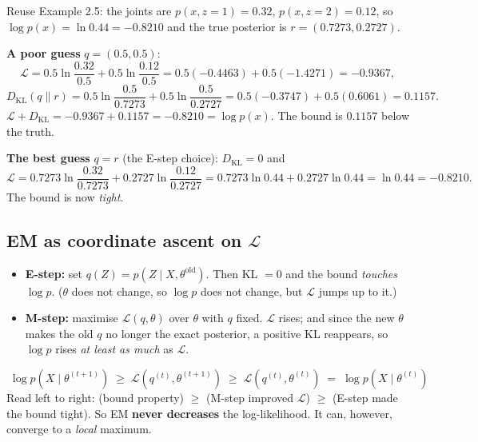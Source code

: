 \documentclass[11pt,a4paper]{article}
\newcommand{\KL}{D_{\mathrm{KL}}}
\newcommand{\Lb}{\mathcal{L}}
\begin{document}
\begin{example}[Example 3.3: Checking $\log p=\Lb+\mathrm{KL}$ numerically]
Reuse Example 2.5: the joints are $p(x,z{=}1)=0.32$, $p(x,z{=}2)=0.12$, so $\log p(x)=\ln0.44=-0.8210$ and the true posterior is $r=(0.7273,0.2727)$.

\textbf{A poor guess} $q=(0.5,0.5)$:
\[
\Lb=0.5\ln\frac{0.32}{0.5}+0.5\ln\frac{0.12}{0.5}=0.5(-0.4463)+0.5(-1.4271)=-0.9367,
\]
\[
\KL(q\|r)=0.5\ln\frac{0.5}{0.7273}+0.5\ln\frac{0.5}{0.2727}=0.5(-0.3747)+0.5(0.6061)=0.1157.
\]
$\Lb+\KL=-0.9367+0.1157=-0.8210=\log p(x)$. \checkmark\quad The bound is $0.1157$ below the truth.

\textbf{The best guess} $q=r$ (the E-step choice): $\KL=0$ and
\[
\Lb=0.7273\ln\frac{0.32}{0.7273}+0.2727\ln\frac{0.12}{0.2727}=0.7273\ln0.44+0.2727\ln0.44=\ln0.44=-0.8210.
\]
The bound is now \emph{tight}.
\end{example}

\subsection{EM as coordinate ascent on \texorpdfstring{$\Lb$}{L}}

\begin{center}
\end{center}

\begin{itemize}[leftmargin=*]
\item \textbf{E-step:} set $q(Z)=p(Z\mid X,\theta^{\text{old}})$. Then KL $=0$ and the bound \emph{touches} $\log p$. ($\theta$ does not change, so $\log p$ does not change, but $\Lb$ jumps up to it.)
\item \textbf{M-step:} maximise $\Lb(q,\theta)$ over $\theta$ with $q$ fixed. $\Lb$ rises; and since the new $\theta$ makes the old $q$ no longer the exact posterior, a positive KL reappears, so $\log p$ rises \emph{at least as much} as $\Lb$.
\end{itemize}
\[
\boxed{\;\log p(X\mid\theta^{(t+1)})\;\ge\;\Lb(q^{(t)},\theta^{(t+1)})\;\ge\;\Lb(q^{(t)},\theta^{(t)})\;=\;\log p(X\mid\theta^{(t)})\;}
\]
Read left to right: (bound property) $\ge$ (M-step improved $\Lb$) $\ge$ (E-step made the bound tight). So EM \textbf{never decreases} the log-likelihood. It can, however, converge to a \emph{local} maximum.
\end{document}
